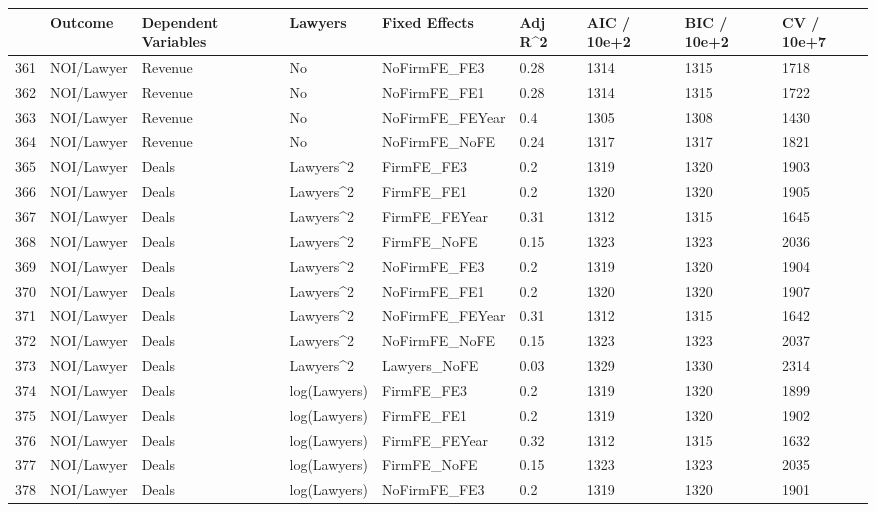 \documentclass{article}
\begin{document}
\begin{table}[H]
\centering
\begin{tabular}{rllllllll}
  \hline
 & Outcome & Dependent Variables & Lawyers & Fixed Effects & Adj R^2 & AIC / 10e+2 & BIC / 10e+2 & CV / 10e+7 \\ 
  \hline
361 & NOI/Lawyer & Revenue & No & NoFirmFE\_FE3 & 0.28 & 1314 & 1315 & 1718 \\ 
  362 & NOI/Lawyer & Revenue & No & NoFirmFE\_FE1 & 0.28 & 1314 & 1315 & 1722 \\ 
  363 & NOI/Lawyer & Revenue & No & NoFirmFE\_FEYear & 0.4 & 1305 & 1308 & 1430 \\ 
  364 & NOI/Lawyer & Revenue & No & NoFirmFE\_NoFE & 0.24 & 1317 & 1317 & 1821 \\ 
  365 & NOI/Lawyer & Deals & Lawyers^2 & FirmFE\_FE3 & 0.2 & 1319 & 1320 & 1903 \\ 
  366 & NOI/Lawyer & Deals & Lawyers^2 & FirmFE\_FE1 & 0.2 & 1320 & 1320 & 1905 \\ 
  367 & NOI/Lawyer & Deals & Lawyers^2 & FirmFE\_FEYear & 0.31 & 1312 & 1315 & 1645 \\ 
  368 & NOI/Lawyer & Deals & Lawyers^2 & FirmFE\_NoFE & 0.15 & 1323 & 1323 & 2036 \\ 
  369 & NOI/Lawyer & Deals & Lawyers^2 & NoFirmFE\_FE3 & 0.2 & 1319 & 1320 & 1904 \\ 
  370 & NOI/Lawyer & Deals & Lawyers^2 & NoFirmFE\_FE1 & 0.2 & 1320 & 1320 & 1907 \\ 
  371 & NOI/Lawyer & Deals & Lawyers^2 & NoFirmFE\_FEYear & 0.31 & 1312 & 1315 & 1642 \\ 
  372 & NOI/Lawyer & Deals & Lawyers^2 & NoFirmFE\_NoFE & 0.15 & 1323 & 1323 & 2037 \\ 
  373 & NOI/Lawyer & Deals & Lawyers^2 & Lawyers\_NoFE & 0.03 & 1329 & 1330 & 2314 \\ 
  374 & NOI/Lawyer & Deals & log(Lawyers) & FirmFE\_FE3 & 0.2 & 1319 & 1320 & 1899 \\ 
  375 & NOI/Lawyer & Deals & log(Lawyers) & FirmFE\_FE1 & 0.2 & 1319 & 1320 & 1902 \\ 
  376 & NOI/Lawyer & Deals & log(Lawyers) & FirmFE\_FEYear & 0.32 & 1312 & 1315 & 1632 \\ 
  377 & NOI/Lawyer & Deals & log(Lawyers) & FirmFE\_NoFE & 0.15 & 1323 & 1323 & 2035 \\ 
  378 & NOI/Lawyer & Deals & log(Lawyers) & NoFirmFE\_FE3 & 0.2 & 1319 & 1320 & 1901 \\ 

\end{tabular}
\end{table}
\end{document}
